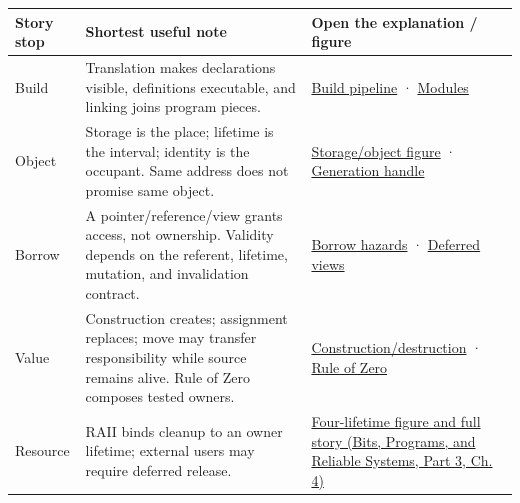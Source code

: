 {\def\LTcaptype{none} %
\begin{longtable}[]{@{}
  >{\raggedright\arraybackslash}p{}
  >{\raggedright\arraybackslash}p{}
  >{\raggedright\arraybackslash}p{}@{}}
\toprule\noalign{}
\begin{minipage}[b]{\linewidth}\raggedright
Story stop
\end{minipage} & \begin{minipage}[b]{\linewidth}\raggedright
Shortest useful note
\end{minipage} & \begin{minipage}[b]{\linewidth}\raggedright
Open the explanation / figure
\end{minipage} \\
\midrule\noalign{}
\endhead
\bottomrule\noalign{}
\endlastfoot
Build & Translation makes declarations visible, definitions executable, and linking joins program pieces. & \hyperref[01-foundations-i-ch002-the-journey-from-text-to-a-live-object]{Build pipeline} · \hyperref[01-foundations-i-ch002-a-compiled-interface-rather-than-repeated-text]{Modules} \\
Object & Storage is the place; lifetime is the interval; identity is the occupant. Same address does not promise same object. & \hyperref[01-foundations-i-ch002-storage-is-a-place-an-object-is-its-occupant]{Storage/object figure} · \hyperref[01-foundations-i-ch002-a-handle-remembers-which-occupant-was-intended]{Generation handle} \\
Borrow & A pointer/reference/view grants access, not ownership. Validity depends on the referent, lifetime, mutation, and invalidation contract. & \hyperref[01-foundations-i-ch003-when-a-valid-borrow-stops-naming-the-intended-thing]{Borrow hazards} · \hyperref[01-foundations-i-ch003-borrowed-views-and-deferred-work-need-an-owner-story]{Deferred views} \\
Value & Construction creates; assignment replaces; move may transfer responsibility while source remains alive. Rule of Zero composes tested owners. & \hyperref[01-foundations-i-ch003-construction-establishes-a-usable-state]{Construction/destruction} · \hyperref[01-foundations-i-ch003-from-three-repairs-to-five-decisions-to-zero-boilerplate]{Rule of Zero} \\
Resource & RAII binds cleanup to an owner lifetime; external users may require deferred release. & \href{../01-Bits-Programs-and-Reliable-Systems-P03/main.pdf\#01-foundations-i-ch004-from-a-live-object-to-responsible-resource-ownership}{Four-lifetime figure and full story (Bits, Programs, and Reliable Systems, Part 3, Ch. 4)} \\

\end{longtable}}

